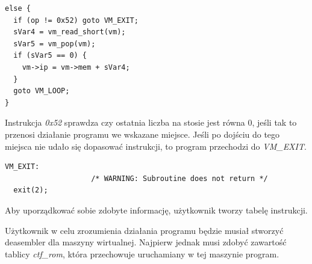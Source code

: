 \documentclass[language=polish,type=eng]{aghmodern}
\begin{document}
\begin{verbatim}
else {
  if (op != 0x52) goto VM_EXIT;
  sVar4 = vm_read_short(vm);
  sVar5 = vm_pop(vm);
  if (sVar5 == 0) {
    vm->ip = vm->mem + sVar4;
  }
  goto VM_LOOP;
}
\end{verbatim}

Instrukcja \emph{0x52} sprawdza czy ostatnia liczba na stosie jest równa 0, jeśli tak
to przenosi działanie programu we wskazane miejsce. Jeśli po dojściu do tego miejsca
nie udało się dopasować instrukcji, to program przechodzi do \emph{VM\_EXIT}.

\begin{verbatim}
VM_EXIT:
                    /* WARNING: Subroutine does not return */
  exit(2);
\end{verbatim}

Aby uporządkować sobie zdobyte informację, użytkownik tworzy tabelę instrukcji.

\begin{table}[H]
\caption{Tabela instrukcji maszyny wirtualnej}
\end{table}

Użytkownik w celu zrozumienia działania programu będzie musiał stworzyć deasembler dla maszyny wirtualnej.
Najpierw jednak musi zdobyć zawartość tablicy \emph{ctf\_rom}, która przechowuje uruchamiany w tej maszynie program.
\end{document}
